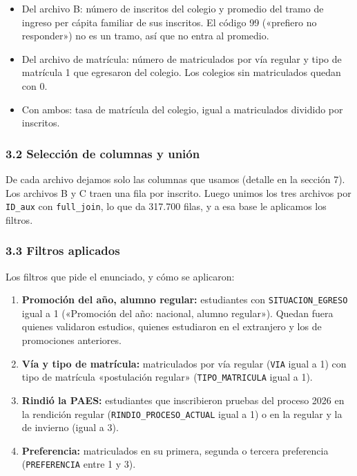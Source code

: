 \documentclass[11pt,letterpaper]{article}
\begin{document}
\begin{itemize}[leftmargin=1.5em, itemsep=0.3em]
  \item Del archivo B: número de inscritos del colegio y promedio del
        tramo de ingreso per cápita familiar de sus inscritos. El código
        99 («prefiero no responder») no es un tramo, así que no entra al
        promedio.
  \item Del archivo de matrícula: número de matriculados por vía regular y
        tipo de matrícula 1 que egresaron del colegio. Los colegios sin
        matriculados quedan con 0.
  \item Con ambos: tasa de matrícula del colegio, igual a matriculados
        dividido por inscritos.
\end{itemize}

\subsubsection*{3.2 \; Selección de columnas y unión}

De cada archivo dejamos solo las columnas que usamos (detalle en la
sección 7). Los archivos B y C traen una fila por inscrito. Luego unimos
los tres archivos por \texttt{ID\_aux} con \texttt{full\_join}, lo que da
317.700 filas, y a esa base le aplicamos los filtros.

\subsubsection*{3.3 \; Filtros aplicados}

Los filtros que pide el enunciado, y cómo se aplicaron:

\begin{enumerate}[leftmargin=1.5em, itemsep=0.3em, label=\textbf{\alph*)}]
  \item \textbf{Promoción del año, alumno regular:} estudiantes con
        \texttt{SITUACION\_EGRESO} igual a 1 («Promoción del año: nacional,
        alumno regular»). Quedan fuera quienes validaron estudios, quienes
        estudiaron en el extranjero y los de promociones anteriores.
  \item \textbf{Vía y tipo de matrícula:} matriculados por vía regular
        (\texttt{VIA} igual a 1) con tipo de matrícula «postulación
        regular» (\texttt{TIPO\_MATRICULA} igual a 1).
  \item \textbf{Rindió la PAES:} estudiantes que inscribieron pruebas del
        proceso 2026 en la rendición regular (\texttt{RINDIO\_PROCESO\_ACTUAL}
        igual a 1) o en la regular y la de invierno (igual a 3).
  \item \textbf{Preferencia:} matriculados en su primera, segunda o
        tercera preferencia (\texttt{PREFERENCIA} entre 1 y 3).
\end{enumerate}
\end{document}

